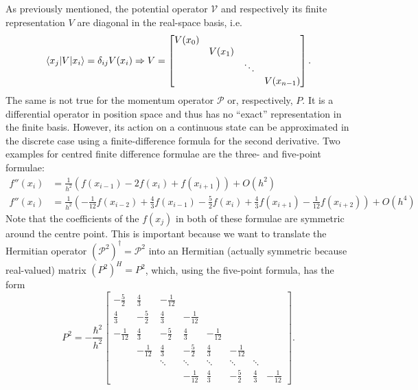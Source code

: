 \documentclass[a4paper,DIV=12,english]{scrartcl}
\begin{document}
As previously mentioned, the potential operator $\mathcal{V}$ and respectively its finite representation $V$ are diagonal in the real-space basis, i.e.
\begin{equation}
    \braket{x_j|V|x_i} = \delta_{ij}V(x_i) \Rightarrow V = \begin{bmatrix}
        V(x_0) & & & \\
        & V(x_1) & & \\
        & & \ddots & \\
        & & & V(x_{n-1})
    \end{bmatrix}.
\end{equation}
The same is not true for the momentum operator $\mathcal{P}$ or, respectively, $P$. It is a differential operator in position space and thus has no \enquote{exact} representation in the finite basis. However, its action on a continuous state can be approximated in the discrete case using a finite-difference formula for the second derivative. Two examples for centred finite difference formulae are the three- and five-point formulae:
\begin{align}
    f''(x_i) &= \frac{1}{h^2}\left(f(x_{i-1}) - 2f(x_i) + f(x_{i+1})\right) + O(h^2) \\
    f''(x_i) &= \frac{1}{h^2}\left(-\frac{1}{12}f(x_{i-2}) + \frac{4}{3}f(x_{i-1}) - \frac{5}{2}f(x_i) + \frac{4}{3}f(x_{i+1}) -\frac{1}{12}f(x_{i+2}) \right) + O(h^4)
\end{align}
Note that the coefficients of the $f(x_j)$ in both of these formulae are symmetric around the centre point. This is important because we want to translate the Hermitian operator $(\mathcal{P}^2)^\dag = \mathcal{P}^2$ into an Hermitian (actually symmetric because real-valued) matrix $(P^2)^H = P^2$, which, using the five-point formula, has the form
\begin{equation}
    P^2 = -\frac{\hbar^2}{h^2}\begin{bmatrix}
        - \frac{5}{2} & \frac{4}{3} & -\frac{1}{12}& & & \\
        \frac{4}{3} & - \frac{5}{2} & \frac{4}{3} &-\frac{1}{12} & & \\
        -\frac{1}{12} & \frac{4}{3} & - \frac{5}{2} & \frac{4}{3} &-\frac{1}{12} & \\
        & -\frac{1}{12} & \frac{4}{3} & - \frac{5}{2} & \frac{4}{3} &-\frac{1}{12}  \\
        & & \ddots & \ddots & \ddots & \ddots & \ddots \\
        & & & -\frac{1}{12} & \frac{4}{3} & - \frac{5}{2} & \frac{4}{3} &-\frac{1}{12}
    \end{bmatrix}.
\end{equation}
\end{document}
